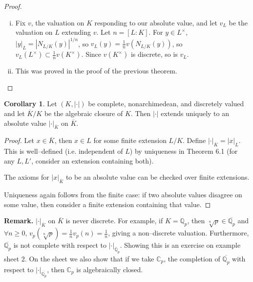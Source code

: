 \documentclass{article}
\theoremstyle{definition}
\newtheorem{cor}[theorem]{Corollary}
\begin{document}
\begin{proof}
    \begin{enumerate}[(i)]
        \item Fix $v$, the valuation on $K$ responding to our absolute value, and let $v_L$ be the valuation on $L$ extending $v$. Let $n = [L:K]$. For $y \in L^\times$, $|y|_L = |N_{L/K}(y)|^{1/n}$, so $v_L(y)=\frac{1}{n}v(N_{L/K}(y))$, so $v_L(L^\times) \subset \frac{1}{n}v(K^{\times})$. Since $v(K^\times)$ is discrete, so is $v_L$.
        \item This was proved in the proof of the previous theorem.
    \end{enumerate}
\end{proof}
\begin{cor}
    Let $(K, |\cdot|)$ be complete, nonarchimedean, and discretely valued and let $\overline{K}/K$ be the algebraic closure of $K$. Then $|\cdot|$ extends uniquely to an absolute value $|\cdot|_{\overline{K}}$ on $\overline{K}$.
\end{cor}
\begin{proof}
    Let $x \in \overline{K}$, then $x \in L$ for some finite extension $L/K$. Define $|\cdot|_{\overline{K}} = |x|_L$. This is well--defined (i.e. independent of $L$) by uniqueness in Theorem 6.1 (for any $L,L'$, consider an extension containing both).
    \vspace{1mm}
     
    The axioms for $|x|_{\overline{K}}$ to be an absolute value can be checked over finite extensions.
    \vspace{1mm}
     
    Uniqueness again follows from the finite case: if two absolute values disagree on some value, then consider a finite extension containing that value.
\end{proof}
\textbf{Remark.} $|\cdot|_{\overline{K}}$ on $\overline{K}$ is never discrete. For example, if $K = \mathbb{Q}_p$, then $\sqrt[n]{p} \in \overline{\mathbb{Q}_p}$ and $\forall n\ge 0$, $v_p(\sqrt[n]{p}) = \frac{1}{n}v_p(n) = \frac{1}{n}$, giving a non--discrete valuation. Furthermore, $\overline{\mathbb{Q}_p}$ is not complete with respect to $|\cdot |_{\overline{\mathbb{Q}}_p}$. Showing this is an exercise on example sheet 2. On the sheet we also show that if we take $\mathbb{C}_p$, the completion of $\overline{\mathbb{Q}_p}$ with respect to $|\cdot|_{\overline{\mathbb{Q}_p}}$, then $\mathbb{C}_p$ is algebraically closed.
\end{document}
